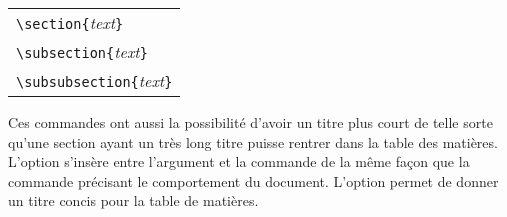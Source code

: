 %	
\begin{table}[H]
	\centering
	\begin{tabular}{l}
		\verb|\section{|\textit{text}\verb|}|\\
		\verb|\subsection{|\textit{text}\verb|}|\\
		\verb|\subsubsection{|\textit{text}\verb|}|
	\end{tabular}
\end{table}
%	
\par Ces commandes ont aussi la possibilité d'avoir un titre plus court de telle sorte qu'une section ayant un très long titre puisse rentrer dans la table des matières. L'option s'insère entre l'argument et la commande de la même façon que la commande précisant le comportement du document. L'option permet de donner un titre concis pour la table de matières.